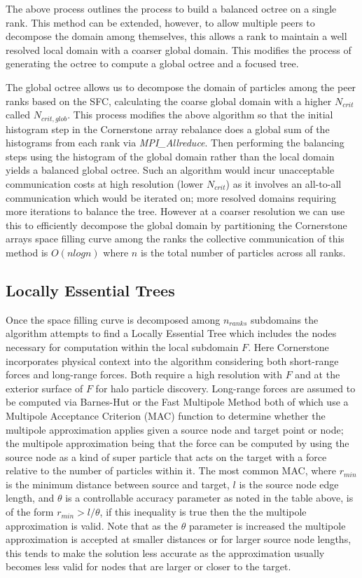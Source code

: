 The above process outlines the process to build a balanced octree on a single rank. This method can be extended, however, to allow multiple peers to decompose the domain among themselves, this allows a rank to maintain a well resolved local domain with a coarser global domain. This modifies the process of generating the octree to compute a global octree and a focused tree. 

The global octree allows us to decompose the domain of particles among the peer ranks based on the SFC, calculating the coarse global domain with a higher $N_{crit}$ called $N_{crit,glob}$. This process modifies the above algorithm so that the initial histogram step in the Cornerstone array rebalance does a global sum of the histograms from each rank via \textit{MPI\_Allreduce}. Then performing the balancing steps using the histogram of the global domain rather than the local domain yields a balanced global octree. Such an algorithm would incur unacceptable communication costs at high resolution (lower $N_{crit}$) as it involves an all-to-all communication which would be iterated on; more resolved domains requiring more iterations to balance the tree. However at a coarser resolution we can use this to efficiently decompose the global domain by partitioning the Cornerstone arrays space filling curve among the ranks the collective communication of this method is $O(nlogn)$ where $n$ is the total number of particles across all ranks.

\subsection{Locally Essential Trees}

Once the space filling curve is decomposed among $n_{ranks}$ subdomains the algorithm attempts to find a Locally Essential Tree which includes the nodes necessary for computation within the local subdomain $F$. Here Cornerstone ~\cite{cornerstone} incorporates physical context into the algorithm considering both short-range forces and long-range forces. Both require a high resolution with $F$ and at the exterior surface of $F$ for halo particle discovery. Long-range forces are assumed to be computed via Barnes-Hut or the Fast Multipole Method both of which use a Multipole Acceptance Criterion (MAC) function to determine whether the multipole approximation applies given a source node and target point or node; the multipole approximation being that the force can be computed by using the source node as a kind of super particle that acts on the target with a force relative to the number of particles within it. The most common MAC, where $r_{min}$ is the minimum distance between source and target, $l$ is the source node edge length, and $\theta$ is a controllable accuracy parameter as noted in the table above, is of the form $r_{min} > l/\theta$, if this inequality is true then the the multipole approximation is valid. Note that as the $\theta$ parameter is increased the multipole approximation is accepted at smaller distances or for larger source node lengths, this tends to make the solution less accurate as the approximation usually becomes less valid for nodes that are larger or closer to the target. 

